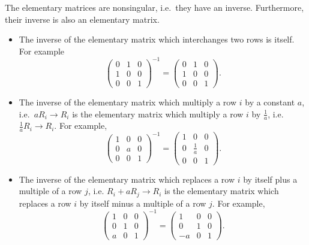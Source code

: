 \documentclass[
  a4paper,
  DIV=11,
  numbers=noendperiod,
  oneside]{scrreprt}
\theoremstyle{definition}
\theoremstyle{remark}
\newenvironment{fbxSimple}[3]{\begin{tcolorbox}[enhanced, breakable,%
attach boxed title to top*={xshift=1.4pt},
boxed title style={boxrule=0.0mm, fuzzy shadow={1pt}{-1pt}{0mm}{0.1mm}{gray}, arc=.3em, rounded corners=east, sharp corners=west}, colframe=#1-color2, colbacktitle=#1-color1, colback = white, coltitle=black,  titlerule=0mm, toprule=0pt, bottomrule=.7pt, leftrule=.3em, rightrule=.7pt, outer arc=.3em,  	left=.5em, right=.5em, bottomtitle=1mm, toptitle=1mm,title=\textbf{#2}\hspace{0.5em}{#3}]}
{\end{tcolorbox}}
\begin{document}
\label{inverse-of-elementary-matrices}
\begin{fbxSimple}{Corollary}{Corollary 3.13: }{Inverse of elementary matrices}
\label{inverse-of-elementary-matrices}
The elementary matrices are nonsingular, i.e.~they have an inverse.
Furthermore, their inverse is also an elementary matrix.

\end{fbxSimple}

\begin{itemize}
\item
  The inverse of the elementary matrix which interchanges two rows is
  itself. For example
  \[\left(\begin{array}{ccc}0 & 1 & 0\\ 1 & 0 & 0 \\ 0 & 0 & 1\end{array}\right)^{-1} =\left(\begin{array}{ccc}0 & 1 & 0\\ 1 & 0 & 0 \\ 0 & 0 & 1\end{array}\right).\]
\item
  The inverse of the elementary matrix which multiply a row \(i\) by a
  constant \(a\), i.e.~\(aR_{i}\rightarrow R_{i}\) is the elementary
  matrix which multiply a row \(i\) by \(\frac{1}{a}\),
  i.e.~\(\frac{1}{a}R_{i}\rightarrow R_{i}\). For example,
  \[\left(\begin{array}{ccc}1 & 0 & 0\\ 0 & a & 0 \\ 0 & 0 & 1\end{array}\right)^{-1} =\left(\begin{array}{ccc}1 & 0 & 0\\ 0 & \frac{1}{a} & 0 \\ 0 & 0 & 1\end{array}\right).\]
\item
  The inverse of the elementary matrix which replaces a row \(i\) by
  itself plus a multiple of a row \(j\), i.e.
  \(R_{i}+aR_{j}\rightarrow R_{i}\) is the elementary matrix which
  replaces a row \(i\) by itself minus a multiple of a row \(j\). For
  example,
  \[\left(\begin{array}{ccc}1 & 0 & 0\\ 0 & 1 & 0 \\ a & 0 & 1\end{array}\right)^{-1}=\left(\begin{array}{ccc}1 & 0 & 0\\ 0 & 1 & 0 \\ -a & 0 & 1\end{array}\right).\]
\end{itemize}
\end{document}
